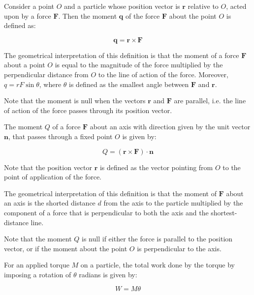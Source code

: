 \documentclass[12pt]{article}
\begin{document}
\begin{definition}
    Consider a point $O$ and a particle whose position vector is $\mathbf{r}$ relative to $O$, acted upon by a force $\mathbf{F}$. Then the moment $\mathbf{q}$ of the force $\mathbf{F}$ about the point $O$ is defined as:

    \[ \mathbf{q} = \mathbf{r} \times \mathbf{F} \]
\end{definition}

The geometrical interpretation of this definition is that the moment of a force $\mathbf{F}$ about a point $O$ is equal to the magnitude of the force multiplied by the perpendicular distance from $O$ to the line of action of the force. Moreover, $q = rF\sin{\theta}$, where $\theta$ is defined as the smallest angle between $\mathbf{F}$ and $\mathbf{r}$.

Note that the moment is null when the vectors $\mathbf{r}$ and $\mathbf{F}$ are parallel, i.e. the line of action of the force passes through its position vector.

\begin{definition}
    The moment $Q$ of a force $\mathbf{F}$ about an axis with direction given by the unit vector $\mathbf{n}$, that passes through a fixed point $O$ is given by:

    \[ Q = \left(\mathbf{r} \times \mathbf{F}\right) \cdot \mathbf{n} \]

    Note that the position vector $\mathbf{r}$ is defined as the vector pointing from $O$ to the point of application of the force.

    The geometrical interpretation of this definition is that the moment of $\mathbf{F}$ about an axis is the shorted distance $d$ from the axis to the particle multiplied by the component of a force that is perpendicular to both the axis and the shortest-distance line.

    Note that the moment $Q$ is null if either the force is parallel to the position vector, or if the moment about the point $O$ is perpendicular to the axis.
\end{definition}

\begin{theorem}
    For an applied torque $M$ on a particle, the total work done by the torque by imposing a rotation of $\theta$ radians is given by:

    \[ W = M\theta \]
\end{theorem}
\end{document}
